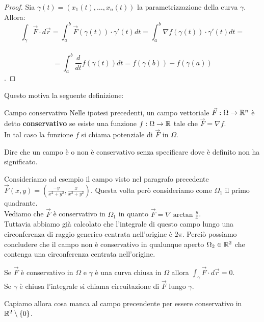 \begin{proof}
  Sia $\gamma(t) = (x_1(t), \ldots, x_n(t))$ la parametrizzazione della curva $\gamma$.\\
  Allora:
  $$\int_\gamma \vec F \cdot d\vec r = \int_a^b \vec F(\gamma(t)) \cdot \gamma'(t) dt = \int_a^b \nabla f(\gamma(t)) \cdot \gamma'(t) dt =$$\\
  $$= \int_a^b \frac{d}{dt} f(\gamma(t)) dt = f(\gamma(b)) - f(\gamma(a))$$.
\end{proof}

Questo motiva la seguente definizione:
\begin{definizione}{Campo conservativo}
  Nelle ipotesi precedenti, un campo vettoriale $\vec F: \Omega \rightarrow \mathbb{R}^n$ è detto \textbf{conservativo} se esiste una funzione $f: \Omega \rightarrow \mathbb{R}$ tale che $\vec F = \nabla f$. \\ In tal caso la funzione $f$ si chiama potenziale di $\vec F$ in $\Omega$.
\end{definizione}

\begin{osservazione}{}
  Dire che un campo è o non è conservativo senza specificare dove è definito non ha significato.\\
\end{osservazione}

Consideriamo ad esempio il campo visto nel paragrafo precedente $\vec F(x,y) = (\frac{-y}{x^2+y^2}, \frac{x}{x^2+y^2})$. Questa volta però consideriamo come $\Omega_1$ il primo quadrante.\\
Vediamo che $\vec F$ è conservativo in $\Omega_1$ in quanto $\vec F = \nabla \arctan \frac{y}{x}$.\\
Tuttavia abbiamo già calcolato che l'integrale di questo campo lungo una circonferenza di raggio generico centrata nell'origine è $2\pi$. Perciò possiamo concludere che il campo non è conservativo in qualunque aperto $\Omega_2 \in \mathbb{R}^2$ che contenga una circonferenza centrata nell'origine.\\

\begin{osservazione}{}
  Se $\vec F$ è conservativo in $\Omega$ e $\gamma$ è una curva chiusa in $\Omega$ allora $\int_\gamma \vec F \cdot d\vec r = 0$.\\
  Se $\gamma$ è chiusa l'integrale si chiama circuitazione di $\vec F$ lungo $\gamma$.
\end{osservazione}

Capiamo allora cosa manca al campo precendente per essere conservativo in $\mathbb{R}^2 \setminus \{0\}$.\\


